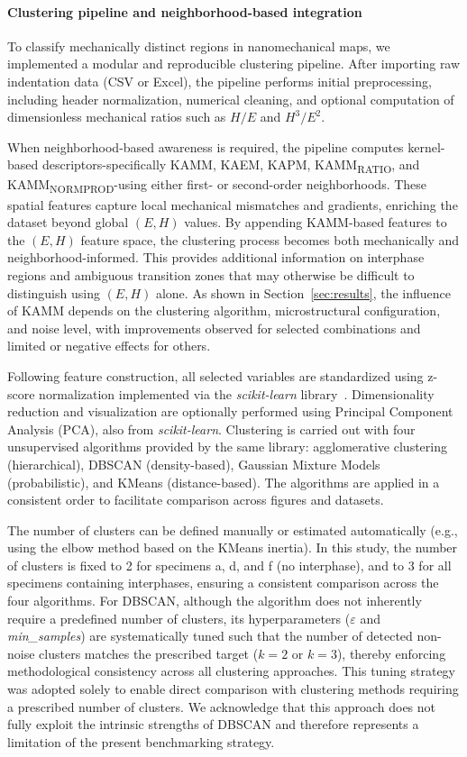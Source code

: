 \documentclass[final,3p,times]{elsarticle}
\begin{document}
\paragraph{Clustering pipeline and neighborhood-based integration}
To classify mechanically distinct regions in nanomechanical maps, we implemented a modular and reproducible clustering pipeline. After importing raw indentation data (CSV or Excel), the pipeline performs initial preprocessing, including header normalization, numerical cleaning, and optional computation of dimensionless mechanical ratios such as $H/E$ and $H^3/E^2$.

When neighborhood-based awareness is required, the pipeline computes kernel-based descriptors-specifically KAMM, KAEM, KAPM, KAMM\textsubscript{RATIO}, and KAMM\textsubscript{NORMPROD}-using either first- or second-order neighborhoods. These spatial features capture local mechanical mismatches and gradients, enriching the dataset beyond global $(E, H)$ values. By appending KAMM-based features to the $(E, H)$ feature space, the clustering process becomes both mechanically and neighborhood-informed. This provides additional information on interphase regions and ambiguous transition zones that may otherwise be difficult to distinguish using $(E,H)$ alone. As shown in Section~\ref{sec:results}, the influence of KAMM depends on the clustering algorithm, microstructural configuration, and noise level, with improvements observed for selected combinations and limited or negative effects for others.

Following feature construction, all selected variables are standardized using z-score normalization implemented via the \textit{scikit-learn} library~\cite{scikit-learn, sklearn_api}. Dimensionality reduction and visualization are optionally performed using Principal Component Analysis (PCA), also from \textit{scikit-learn}. Clustering is carried out with four unsupervised algorithms provided by the same library: agglomerative clustering (hierarchical), DBSCAN (density-based), Gaussian Mixture Models (probabilistic), and KMeans (distance-based). The algorithms are applied in a consistent order to facilitate comparison across figures and datasets.

The number of clusters can be defined manually or estimated automatically (e.g., using the elbow method based on the KMeans inertia). In this study, the number of clusters is fixed to 2 for specimens a, d, and f (no interphase), and to 3 for all specimens containing interphases, ensuring a consistent comparison across the four algorithms. For DBSCAN, although the algorithm does not inherently require a predefined number of clusters, its hyperparameters ($\varepsilon$ and \textit{min\_samples}) are systematically tuned such that the number of detected non-noise clusters matches the prescribed target ($k = 2$ or $k = 3$), thereby enforcing methodological consistency across all clustering approaches. This tuning strategy was adopted solely to enable direct comparison with clustering methods requiring a prescribed number of clusters. We acknowledge that this approach does not fully exploit the intrinsic strengths of DBSCAN and therefore represents a limitation of the present benchmarking strategy.
\end{document}
